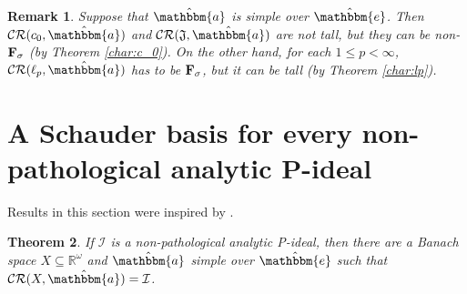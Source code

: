 \documentclass{amsart}
\newcommand{\I}{\mathcal{I}}
\newcommand{\CR}{\mathcal{CR}}
\newcommand{\w}{\mathbbm}
\newtheorem{theorem}{Theorem}[section]
\newtheorem{remark}[theorem]{Remark}
\begin{document}
\begin{remark}
\label{remark}
Suppose that $\hat{\w{a}}$ is simple over $\hat{\w{e}}$. Then $\CR(c_0,\hat{\w{a}})$ and $\CR(\mathfrak{J},\hat{\w{a}})$ are not tall, but they can be non-$\bf{F_\sigma}$ (by Theorem \ref{char:c_0}). On the other hand, for each $1\leq p<\infty$, $\CR(\ell_p,\hat{\w{a}})$ has to be $\bf{F_\sigma}$, but it can be tall (by Theorem \ref{char:lp}).
\end{remark}



\section{A Schauder basis for every non-pathological analytic P-ideal}

Results in this section were inspired  by \cite[Proposition 5.3]{PBNF}.

\begin{theorem}
\label{T:allP}
If $\I$ is a non-pathological analytic P-ideal, then there are a Banach space $X\subseteq \mathbb{R}^\omega$ and $\hat{\w{a}}$ simple over $\hat{\w{e}}$ such that $\CR(X,\hat{\w{a}})=\I$.
\end{theorem}
\end{document}
